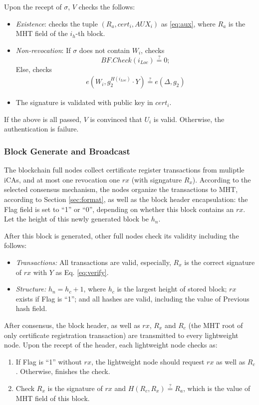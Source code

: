 \documentclass[conference]{IEEEtran}
\begin{document}
Upon the recept of $\sigma$, $V$ checks the follows:
\begin{itemize}
	\item \textit{Existence}: checks the tuple $(R_a, cert_i, AUX_i)$ as \eqref{eq:aux}, where $R_a$ is the MHT field of the $i_h$-th block.
	\item \textit{Non-revocation}: If $\sigma$ does not contain $W_i$, checks $$BF.Check(i_{Loc})\overset{?}{=} 0;$$ Else, checks 
	\begin{align} \label{eq:authenticate}
		e(W_i, g_2^{H(i_{Loc})}\cdot Y) \overset{?}{=} e(\Delta, g_2)
	\end{align}
	\item The signature is validated with public key in $cert_i$.
\end{itemize}
If the above is all passed, $V$ is convinced that $U_i$ is valid. Otherwise, the authentication is failure. 


\subsubsection{Block Generate and Broadcast}\label{section:block_consensus}

The blockchain full nodes collect certificate register transactions from muliptle iCAs, and at most one revocation one $rx$ (with signgature $R_x$). According to the selected consensus mechanism, the nodes organize the transactions to MHT, according to Section \ref{sec:format}, as well as the block header encapsulation: the Flag field is set to ``1'' or ``0'', depending on whether this block contains an $rx$. Let the height of this newly generated block be $h_n$.

After this block is generated, other full nodes check its validity including the follows:
\begin{itemize}
	\item \textit{Transactions:} All transactions are valid, especially, $R_x$ is the correct signature of $rx$ with $Y$ as Eq. \eqref{eq:verify}.
	\item \textit{Structure:} $h_n = h_c + 1$, where $h_c$ is the largest height of stored block; $rx$ exists if Flag is ``1''; and all hashes are valid, including the value of Previous hash field.
\end{itemize}

After consensus, the block header, as well as $rx$, $R_x$ and $R_c$ (the MHT root of only certificate registration transaction) are transmitted to every lightweight node. 
Upon the recept of the header, each lightweight node checks as: 
\begin{enumerate}
	\item If Flag is ``1'' without $rx$, the lightweight node should request $rx$ as well as $R_c$. Otherwise, finishes the check.
	\item Check $R_x$ is the signature of $rx$ and $H(R_c, R_x) \overset{?}{=} R_a$, which is the value of MHT field of this block. 
\end{enumerate}
\end{document}
